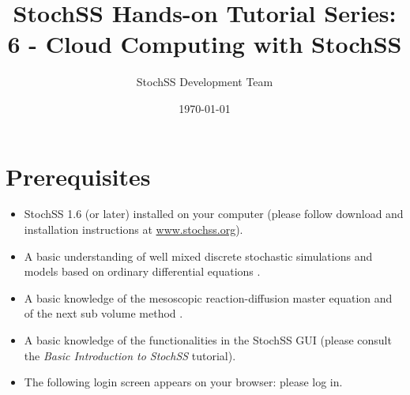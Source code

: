 \documentclass[12pt,notitlepage,nofootinbib]{revtex4}
\begin{document}
\title{StochSS Hands-on Tutorial Series: 6 - Cloud Computing with StochSS}

\author{StochSS Development Team}

\date{\today}

\maketitle

\section{\label{sec:pre}Prerequisites}
\begin{itemize}
\item StochSS 1.6 (or later) installed on your computer (please follow download and installation instructions at \url{www.stochss.org}). 
\item A basic understanding of well mixed discrete stochastic simulations and models based on ordinary differential equations \cite{dan,sundials}.
\item A basic knowledge of the mesoscopic reaction-diffusion master equation and of the next sub volume method \cite{nsm}.
\item  A basic knowledge of the functionalities in the StochSS GUI (please consult the \textit{Basic Introduction to StochSS} tutorial).
\item The following login screen appears on your browser: please log in.
\end{itemize}
\end{document}
